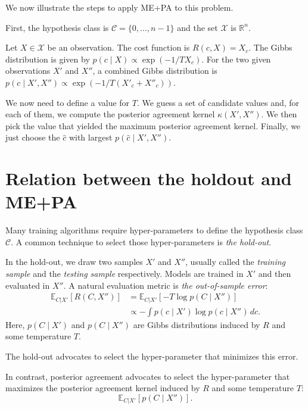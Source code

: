 We now illustrate the steps to apply ME+PA to this problem.

First, the hypothesis class is $\mathcal{C} = \{0, \ldots, n-1\}$ and the set $\mathcal{X}$ is $\mathbb{R}^n$.

Let $X \in \mathcal{X}$ be an observation. The cost function is $R(c, X) = X_c$. The Gibbs distribution is given by $p(c \mid X) \propto \exp\left(-1/T X_c\right)$. For the two given observations $X'$ and $X''$, a combined Gibbs distribution is $p(c \mid X', X'') \propto \exp\left(-1/T \left(X'_c + X''_c\right)\right)$.

We now need to define a value for $T$. We guess a set of candidate values and, for each of them, we compute the posterior agreement kernel $\kappa(X', X'')$. We then pick the value that yielded the maximum posterior agreement kernel. Finally, we just choose the $\hat{c}$ with largest $p(\hat{c} \mid X', X'')$.

\section{Relation between the holdout and ME+PA}

Many training algorithms require hyper-parameters to define the hypothesis class $\mathcal{C}$. A common technique to select those hyper-parameters is \emph{the hold-out}. 

In the hold-out, we draw two samples $X'$ and $X''$, usually called the \emph{training sample} and the \emph{testing sample} respectively. Models are trained in $X'$ and then evaluated in $X''$. A natural evaluation metric is \emph{the out-of-sample error}:
%
\begin{align}
\mathbb{E}_{C | X'}\left[R(C, X'')\right] &= \mathbb{E}_{C | X'}\left[- T \log p(C \mid X'')\right]\\ 
&\propto - \int p(c \mid X') \log p(c \mid X'') \, dc.
\end{align}
%
Here, $p(C \mid X')$ and $p(C \mid X'')$ are Gibbs distributions induced by $R$ and some temperature $T$.

The hold-out advocates to select the hyper-parameter that minimizes this error.

In contrast, posterior agreement advocates to select the hyper-parameter that maximizes the posterior agreement kernel induced by $R$ and some temperature $T$:
%
\begin{equation}
\mathbb{E}_{C | X'}\left[p(C \mid X'')\right].
\end{equation}

